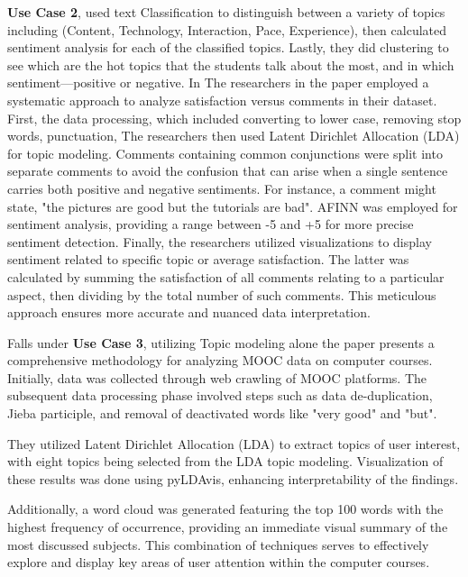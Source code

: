 \textbf{Use Case 2}, \cite{Analyzing_educational_comments_for_topics_and_sentiments:_A_text_analytics_approach} used text Classification to distinguish between a variety of topics including (Content, Technology, Interaction, Pace, Experience), then calculated sentiment analysis for each of the classified topics. Lastly, they did clustering to see which are the hot topics that the students talk about the most, and in which sentiment—positive or negative. In \cite{Visualizing_Student_Opinion_Through_Text_Analysis} The researchers in the paper employed a systematic approach to analyze satisfaction versus comments in their dataset. First, the data processing, which included converting to lower case, removing stop words, punctuation, The researchers then used Latent Dirichlet Allocation (LDA) for topic modeling.
Comments containing common conjunctions were split into separate comments to avoid the confusion that can arise when a single sentence carries both positive and negative sentiments. For instance, a comment might state, "the pictures are good but the tutorials are bad".
AFINN was employed for sentiment analysis, providing a range between -5 and +5 for more precise sentiment detection. Finally, the researchers utilized visualizations to display sentiment related to specific topic or average satisfaction. The latter was calculated by summing the satisfaction of all comments relating to a particular aspect, then dividing by the total number of such comments. This meticulous approach ensures more accurate and nuanced data interpretation.


Falls under \textbf{Use Case 3}, utilizing Topic modeling alone the paper \cite{A_Study_of_MOOC_Course_Review_Topics_Mining_Based_on_LDA_Topic_Model} presents a comprehensive methodology for analyzing MOOC data on computer courses. Initially, data was collected through web crawling of MOOC platforms. The subsequent data processing phase involved steps such as data de-duplication, Jieba participle, and removal of deactivated words like "very good" and "but".

They utilized Latent Dirichlet Allocation (LDA) to extract topics of user interest, with eight topics being selected from the LDA topic modeling. Visualization of these results was done using pyLDAvis, enhancing interpretability of the findings.

Additionally, a word cloud was generated featuring the top 100 words with the highest frequency of occurrence, providing an immediate visual summary of the most discussed subjects. This combination of techniques serves to effectively explore and display key areas of user attention within the computer courses.

